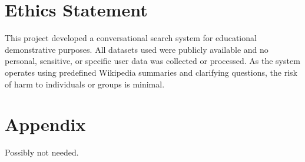 \documentclass[11pt]{article}
\begin{document}
\section*{Ethics Statement}
This project developed a conversational search system for educational demonstrative purposes. All datasets used were publicly available and no personal, sensitive, or specific user data was collected or processed. As the system operates using predefined Wikipedia summaries and clarifying questions, the risk of harm to individuals or groups is minimal. 




\appendix

\section{Appendix}
Possibly not needed.
\end{document}
